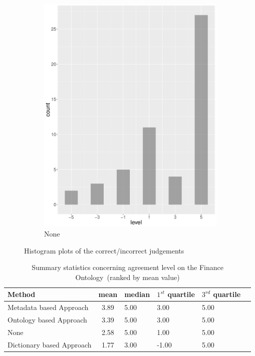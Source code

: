 \begin{figure}
\begin{subfigure}[b]{0.4\textwidth}
        \includegraphics[width=\textwidth]{plots/tennis/hist_level_none}
        \caption{None}
        \label{fig:hist_level_tennis_none}
    \end{subfigure}
    \caption{Histogram plots of the correct/incorrect judgements}\label{fig:hist_level_tennis_all}
\end{figure}


\begingroup
\renewcommand{\arraystretch}{1.5}
\begin{table}
	\begin{tabularx}{\textwidth}{l c*{4}{Y}}
		\toprule
		Method & mean & median & $1^{st}$ quartile & $3^{rd}$ quartile \\
		\midrule
		 Metadata based Approach & 3.89 & 5.00 & 3.00 & 5.00 \\
		 Ontology based Approach & 3.39 & 5.00 & 3.00 & 5.00 \\
		 None & 2.58 & 5.00 & 1.00 & 5.00 \\
		 Dictionary based Approach & 1.77 & 3.00 & -1.00 & 5.00 \\
		\bottomrule
	\end{tabularx}
	\caption{Summary statistics concerning agreement level on the Finance Ontology~(ranked by mean value)}
	\label{table:level_corr_incorr_tennis}
\end{table}
\endgroup